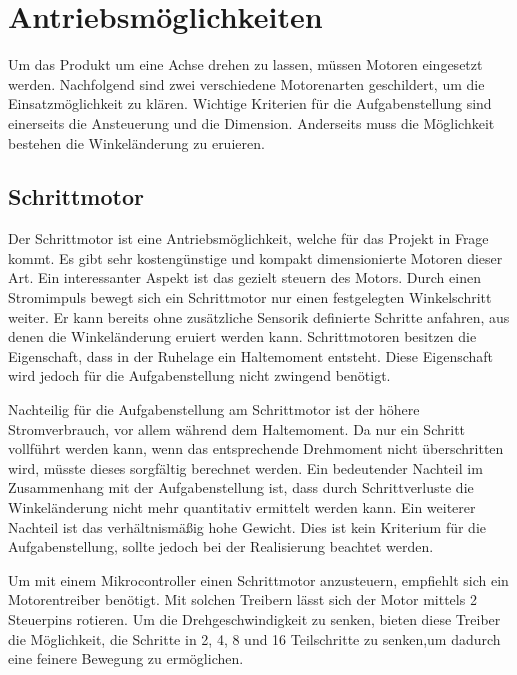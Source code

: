 \section{Antriebsmöglichkeiten}
Um das Produkt um eine Achse drehen zu lassen, müssen Motoren eingesetzt werden. Nachfolgend sind zwei verschiedene Motorenarten geschildert, um die Einsatzmöglichkeit zu klären. Wichtige Kriterien für die Aufgabenstellung sind einerseits die Ansteuerung und die Dimension. Anderseits muss die Möglichkeit bestehen die Winkeländerung zu eruieren. 

\subsection{Schrittmotor}
Der Schrittmotor ist eine Antriebsmöglichkeit, welche für das Projekt in Frage kommt. Es gibt sehr kostengünstige und kompakt dimensionierte Motoren dieser Art. Ein interessanter Aspekt ist das  gezielt steuern des Motors. Durch einen Stromimpuls bewegt sich ein Schrittmotor nur einen festgelegten Winkelschritt weiter. Er kann bereits ohne zusätzliche Sensorik definierte Schritte anfahren, aus denen die Winkeländerung eruiert werden kann. Schrittmotoren besitzen die Eigenschaft, dass in der Ruhelage ein Haltemoment entsteht. Diese Eigenschaft wird jedoch für die Aufgabenstellung nicht zwingend benötigt.

Nachteilig für die Aufgabenstellung am Schrittmotor ist der höhere Stromverbrauch, vor allem während dem Haltemoment. Da nur ein Schritt vollführt werden kann, wenn das entsprechende Drehmoment nicht überschritten wird, müsste dieses sorgfältig berechnet werden. Ein bedeutender Nachteil im Zusammenhang mit der Aufgabenstellung ist, dass durch Schrittverluste die Winkeländerung nicht mehr quantitativ ermittelt werden kann.
Ein weiterer Nachteil ist das verhältnismäßig hohe Gewicht. Dies ist kein Kriterium für die Aufgabenstellung, sollte jedoch bei der Realisierung beachtet werden.

Um mit einem Mikrocontroller einen Schrittmotor anzusteuern, empfiehlt sich ein Motorentreiber benötigt. Mit solchen Treibern lässt sich der Motor mittels 2 Steuerpins rotieren. Um die Drehgeschwindigkeit zu senken, bieten diese Treiber die Möglichkeit, die Schritte in 2, 4, 8 und 16 Teilschritte zu senken,um dadurch eine feinere Bewegung zu ermöglichen. 

